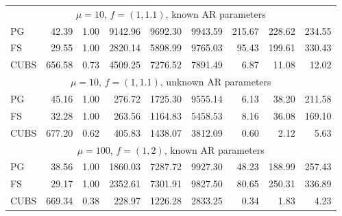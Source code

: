 \documentclass[12pt]{article}
\begin{document}
\begin{table}
\begin{center}
\begin{tabular}{l r r r r r r r r }
      \multicolumn{9}{c}{$\mu=10$, $f = (1,1.1)$, known AR parameters} \\
      PG  &    42.39 &     1.00 &   9142.96 &   9692.30 &   9943.59 &    215.67 &    228.62 &    234.55 \\
      FS  &    29.55 &     1.00 &   2820.14 &   5898.99 &   9765.03 &     95.43 &    199.61 &    330.43 \\
      CUBS  &   656.58 &     0.73 &   4509.25 &   7276.52 &   7891.49 &      6.87 &     11.08 &     12.02

      \\ %

      \multicolumn{9}{c}{$\mu=10$, $f = (1,1.1)$, unknown AR parameters} \\
      PG   &    45.16 &     1.00 &    276.72 &   1725.30 &   9555.14 &      6.13 &     38.20 &    211.58 \\
      FS   &    32.28 &     1.00 &    263.56 &   1164.83 &   5458.53 &      8.16 &     36.08 &    169.10 \\
      CUBS   &   677.20 &     0.62 &    405.83 &   1438.07 &   3812.09 &      0.60 &      2.12 &      5.63
      \\ %

      \multicolumn{9}{c}{$\mu=100$, $f = (1,2)$, known AR parameters} \\
      PG  &    38.56 &     1.00 &   1860.03 &   7287.72 &   9927.30 &     48.23 &    188.99 &    257.43 \\
      FS  &    29.17 &     1.00 &   2352.61 &   7301.91 &   9827.50 &     80.65 &    250.31 &    336.89 \\
      CUBS  &   669.34 &     0.38 &    228.97 &   1226.28 &   2833.25 &      0.34 &      1.83 &      4.23


\end{tabular}
\end{center}
\end{table}
\end{document}
